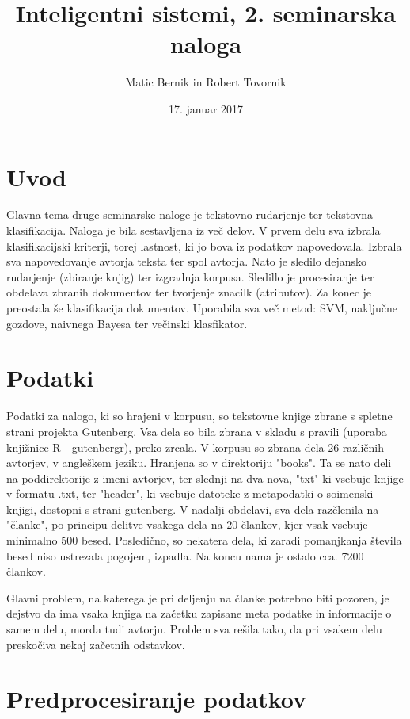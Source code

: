 \documentclass[a4paper,11pt]{article}
\title{Inteligentni sistemi, 2. seminarska naloga}
\author{Matic Bernik in Robert Tovornik}
\date{17. januar 2017}
\begin{document}
\maketitle

\section{Uvod}

Glavna tema druge seminarske naloge je tekstovno rudarjenje ter tekstovna klasifikacija. Naloga je bila sestavljena 
iz več delov. V prvem delu sva izbrala klasifikacijski kriterji, torej lastnost, ki jo bova iz podatkov napovedovala. Izbrala sva 
napovedovanje avtorja teksta ter spol avtorja. Nato je sledilo dejansko rudarjenje (zbiranje knjig) ter izgradnja korpusa. 
Sledillo je procesiranje ter obdelava zbranih dokumentov ter tvorjenje znacilk (atributov). Za konec je preostala še klasifikacija 
dokumentov. Uporabila sva več metod: SVM, naključne gozdove, naivnega Bayesa ter večinski klasfikator.

\section{Podatki}

Podatki za nalogo, ki so hrajeni v korpusu, so tekstovne knjige zbrane s spletne strani projekta Gutenberg.
 Vsa dela so bila zbrana v skladu s pravili (uporaba knjižnice R - gutenbergr), preko zrcala. V korpusu so zbrana dela 26 različnih avtorjev, 
v angleškem jeziku. Hranjena so v direktoriju "books". Ta se nato deli na poddirektorije z imeni avtorjev, ter slednji na dva nova,
 "txt" ki vsebuje knjige v formatu .txt, ter "header", ki vsebuje datoteke z metapodatki o soimenski knjigi, dostopni s strani gutenberg. 
V nadalji obdelavi, sva dela razčlenila na "članke", po principu delitve vsakega dela na 20 člankov, kjer vsak vsebuje minimalno 500 besed. 
Posledično, so nekatera dela, ki zaradi pomanjkanja števila besed niso ustrezala pogojem, izpadla. Na koncu nama je ostalo cca. 7200 člankov.

Glavni problem, na katerega je pri deljenju na članke potrebno biti pozoren, je dejstvo da ima vsaka knjiga na začetku zapisane meta 
podatke in informacije o samem delu, morda tudi avtorju. Problem sva rešila tako, da pri vsakem delu preskočiva nekaj začetnih odstavkov.

\section{Predprocesiranje podatkov}
\end{document}
